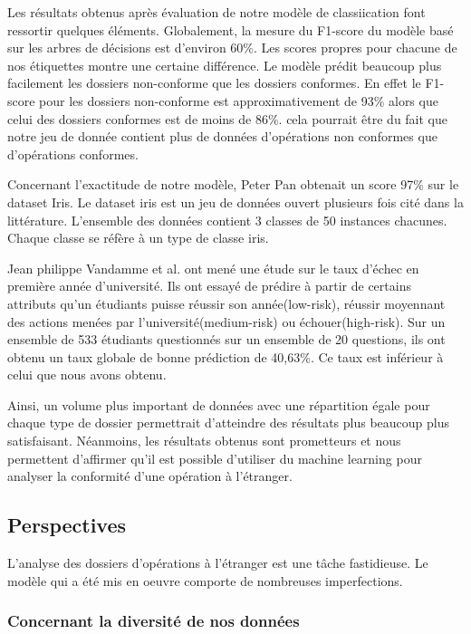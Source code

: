  Les résultats obtenus après évaluation de notre modèle de classiication font
 ressortir quelques éléments.
 Globalement, la mesure du F1-score du modèle basé sur les arbres de décisions
 est d'environ 60\%. Les scores propres pour chacune de nos étiquettes montre
 une certaine différence. Le modèle prédit beaucoup plus facilement les dossiers
 non-conforme que les dossiers conformes. En effet le F1-score pour les dossiers
 non-conforme est approximativement de 93\% alors que celui des dossiers
 conformes est de moins de 86\%. cela pourrait être du fait que notre jeu de
 donnée contient plus de données d'opérations non conformes que d'opérations 
 conformes.
 
 Concernant l'exactitude de notre modèle,
 Peter Pan \cite{mediumPeter} obtenait un score 97\%  sur le dataset Iris.
 Le dataset iris est un jeu de données ouvert plusieurs fois cité dans la
 littérature. L'ensemble des données contient 3 classes de 50 instances 
 chacunes. Chaque classe se réfère à un type de classe iris.
 
 Jean philippe Vandamme et al. \cite{vandamme2006} ont mené une étude sur le taux d'échec en
 première année d'université. Ils ont essayé de prédire à partir de certains
 attributs qu'un étudiants puisse réussir son année(low-risk), réussir moyennant
 des actions menées par l'université(medium-risk) ou échouer(high-risk).
 Sur un ensemble de 533 étudiants questionnés sur un ensemble de 20 questions, ils ont obtenu un taux globale de
 bonne prédiction de 40,63\%. Ce taux est inférieur à celui que nous avons
 obtenu. 

 Ainsi, un volume plus important de données avec une répartition égale
pour chaque type de dossier permettrait d’atteindre des résultats plus beaucoup
plus satisfaisant. Néanmoins, les résultats obtenus sont prometteurs et nous 
permettent d'affirmer qu'il est possible d'utiliser du machine learning pour analyser
la conformité d'une opération à l'étranger.

\subsection{Perspectives}

L'analyse des dossiers d'opérations à l'étranger est une tâche fastidieuse. Le
modèle qui a été mis en oeuvre comporte de nombreuses imperfections.

\subsubsection{Concernant la diversité de nos données}

